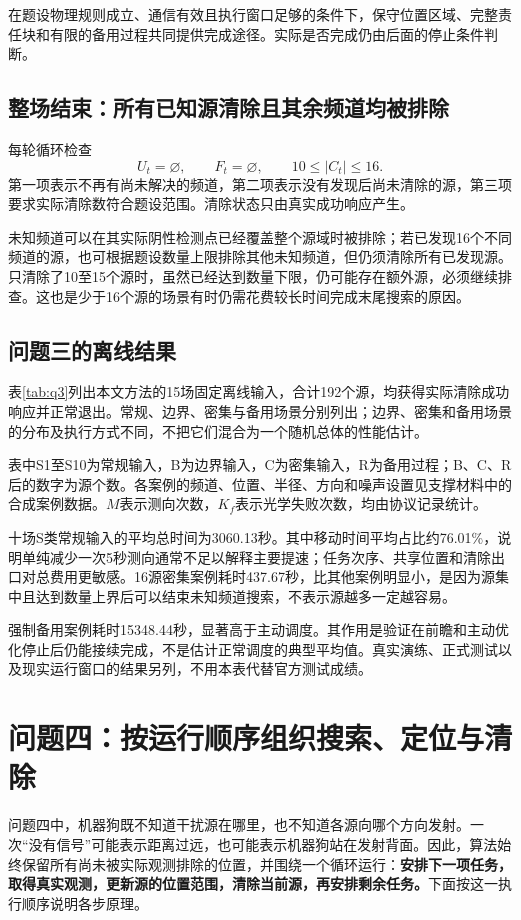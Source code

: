 \documentclass[UTF8,a4paper,12pt,fontset=fandol]{ctexart}
\newcommand{\nextpage}{\clearpage}
\begin{document}
在题设物理规则成立、通信有效且执行窗口足够的条件下，保守位置区域、完整责任块和有限的备用过程共同提供完成途径。实际是否完成仍由后面的停止条件判断。

\subsection{整场结束：所有已知源清除且其余频道均被排除}
每轮循环检查
\begin{equation}\label{eq:stop}
U_t=\varnothing,\qquad F_t=\varnothing,\qquad 10\le|C_t|\le16.
\end{equation}
第一项表示不再有尚未解决的频道，第二项表示没有发现后尚未清除的源，第三项要求实际清除数符合题设范围。清除状态只由真实成功响应产生。

未知频道可以在其实际阴性检测点已经覆盖整个源域时被排除；若已发现16个不同频道的源，也可根据题设数量上限排除其他未知频道，但仍须清除所有已发现源。只清除了10至15个源时，虽然已经达到数量下限，仍可能存在额外源，必须继续排查。这也是少于16个源的场景有时仍需花费较长时间完成末尾搜索的原因。

\nextpage
\subsection{问题三的离线结果}
表\ref{tab:q3}列出本文方法的15场固定离线输入，合计192个源，均获得实际清除成功响应并正常退出。常规、边界、密集与备用场景分别列出；边界、密集和备用场景的分布及执行方式不同，不把它们混合为一个随机总体的性能估计。



表中S1至S10为常规输入，B为边界输入，C为密集输入，R为备用过程；B、C、R后的数字为源个数。各案例的频道、位置、半径、方向和噪声设置见支撑材料中的合成案例数据。$M$表示测向次数，$K_f$表示光学失败次数，均由协议记录统计。

十场S类常规输入的平均总时间为3060.13秒。其中移动时间平均占比约76.01\%，说明单纯减少一次5秒测向通常不足以解释主要提速；任务次序、共享位置和清除出口对总费用更敏感。16源密集案例耗时437.67秒，比其他案例明显小，是因为源集中且达到数量上界后可以结束未知频道搜索，不表示源越多一定越容易。

强制备用案例耗时15348.44秒，显著高于主动调度。其作用是验证在前瞻和主动优化停止后仍能接续完成，不是估计正常调度的典型平均值。真实演练、正式测试以及现实运行窗口的结果另列，不用本表代替官方测试成绩。

\nextpage
\section{问题四：按运行顺序组织搜索、定位与清除}
问题四中，机器狗既不知道干扰源在哪里，也不知道各源向哪个方向发射。一次“没有信号”可能表示距离过远，也可能表示机器狗站在发射背面。因此，算法始终保留所有尚未被实际观测排除的位置，并围绕一个循环运行：\textbf{安排下一项任务，取得真实观测，更新源的位置范围，清除当前源，再安排剩余任务。}下面按这一执行顺序说明各步原理。
\end{document}
